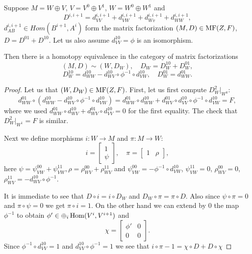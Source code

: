 \begin{lemma} Suppose \(M= W\oplus V\), \(V=V^0\oplus V^1\), \(W=W^0\oplus W^1\) and \[D^{i,i+1}=d_{VV}^{i,i+1}+d_{VW}^{i,i+1}+d_{Wv}^{i,i+1}+d_{WW}^{i,i+1},\]
  \(d_{AB}^{i,i+1}\in Hom(B^{i+1},A^i)\) form the matrix factorization \((M,D)\in \textup{MF}(Z,F)\), \(D=D^{01}+D^{10}\).
  Let us also assume \(d^{10}_{VV}=\phi\) is an isomorphism. 

 Then there is a homotopy equivalence in the category of matrix factorizations
 \[ (M,D)\sim (W,D_W),\quad D_W=D_W^{10}+D_W^{01},\]
 \[D_W^{10}=d_{WW}^{10}-d_{WV}^{10}\circ\phi^{-1}\circ d_{VW}^{10},\quad D_W^{01}=d_{WW}^{01}.\]
\end{lemma}
\begin{proof}
  Let us that \((W,D_W)\in \textup{MF}(Z,F)\). First, let us first compute \(D^2_W|_{W^0}\):
  \[d_{WW}^{01}\circ (d_{WW}^{10}-d_{WV}^{10}\circ\phi^{-1}\circ d_{VW}^{10})=d_{WW}^{01}\circ d_{WW}^{10}+d^{01}_{WV}\circ d^{10}_{VV}\circ \phi^{-1}\circ d_{VW}^{10}=F,\]
  where we used \(d_{WW}^{01}\circ d_{WV}^{10}+d_{WV}^{01}\circ d_{VV}^{10}=0\) for the first equality. The check that \(D^2_W|_{W^1}=F\) is similar.

  Next we define morphisms \(i:W\rightarrow M\) and \(\pi:M\rightarrow W\):
  \[ i=
    \begin{bmatrix}
      1\\
      \psi
    \end{bmatrix},\quad
   \pi= \begin{bmatrix}
      1&\rho
    \end{bmatrix},
  \]
  here \(\psi=\psi_{VW}^{00}+\psi_{VW}^{11},\rho=\rho_{WV}^{00}+\rho_{WV}^{11}\)  and \(\psi_{VW}^{00}=-\phi^{-1}\circ d_{VW}^{10}\), \(\psi_{VW}^{11}=0\),
  \(\rho_{WV}^{00}=0\), \(\rho_{WV}^{11}=-d_{WV}^{10}\circ \phi^{-1}\).

  It is immediate to see that \( D\circ i=i\circ D_W\) and \(D_W\circ \pi=\pi\circ D\). Also since \(\psi\circ \pi=0\) and \(\pi\circ\psi=0\) we get \(\pi\circ i=1\).
  On the other hand we can extend by \(0\) the map \(\phi^{-1}\) to obtain \(\phi'\in \oplus_i\mathop{{\rm Hom}}\nolimits(V^{i},V^{i+1})\) and
  \[\chi=
    \begin{bmatrix}
    \phi'&0\\0&0  
    \end{bmatrix}.
  \]
  Since \(\phi^{-1}\circ d_{VV}^{10}=1\) and \(d_{VV}^{10}\circ \phi^{-1}=1\) we see that \(i\circ \pi-1=\chi\circ D+D\circ \chi\)
\end{proof}  


